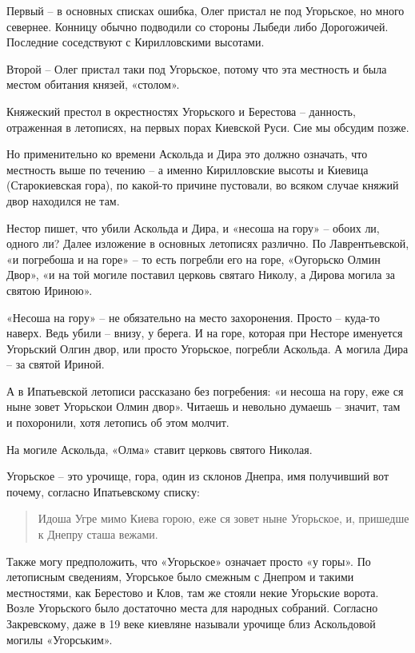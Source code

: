 Первый – в основных списках ошибка, Олег пристал не под Угорьское, но много севернее. Конницу обычно подводили со стороны Лыбеди либо Дорогожичей. Последние соседствуют с Кирилловскими высотами.

Второй – Олег пристал таки под Угорьское, потому что эта местность и была местом обитания князей, «столом».

Княжеский престол в окрестностях Угорьского и Берестова – данность, отраженная в летописях, на первых порах Киевской Руси. Сие мы обсудим позже.

Но применительно ко времени Аскольда и Дира это должно означать, что местность выше по течению – а именно Кирилловские высоты и Киевица (Старокиевская гора), по какой-то причине пустовали, во всяком случае княжий двор находился не там.

Нестор пишет, что убили Аскольда и Дира, и «несоша на гору» – обоих ли, одного ли? Далее изложение в основных летописях различно. По Лаврентьевской, «и погребоша и на горе» – то есть погребли его на горе, «Оугорьско Олмин Двор», «и на той могиле поставил церковь святаго Николу, а Дирова могила за святою Ириною».

«Несоша на гору» – не обязательно на место захоронения. Просто – куда-то наверх. Ведь убили – внизу, у берега. И на горе, которая при Несторе именуется Угорьский Олгин двор, или просто Угорьское, погребли Аскольда. А могила Дира – за святой Ириной.

А в Ипатьевской летописи рассказано без погребения: «и несоша на гору, еже ся ныне зовет Угорьскои Олмин двор». Читаешь и невольно думаешь – значит, там и похоронили, хотя летопись об этом молчит.

На могиле Аскольда, «Олма» ставит церковь святого Николая.
 
Угорьское – это урочище, гора, один из склонов Днепра, имя получивший вот почему, согласно Ипатьевскому списку:

\begin{quotation}
Идоша Угре мимо Киева горою, еже ся зовет ныне Угорьское, и, пришедше к Днепру сташа вежами.
\end{quotation}

Также могу предположить, что «Угорьское» означает просто «у горы». По летописным сведениям, Угорськое было смежным с Днепром и такими местностями, как Берестово и Клов, там же стояли некие Угорьские ворота. Возле Угорьского было достаточно места для народных собраний. Согласно Закревскому, даже в 19 веке киевляне называли урочище близ Аскольдовой могилы «Угорським». 

